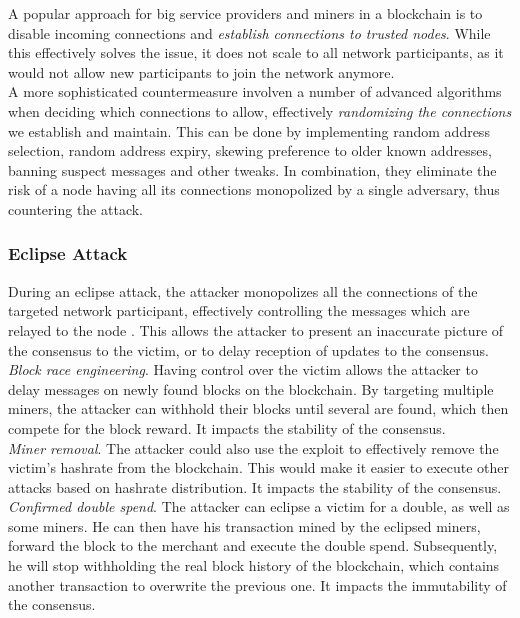 \documentclass[12pt,a4paper]{article}
\begin{document}
A popular approach for big service providers and \glspl{miner} in a \gls{blockchain} is to disable incoming connections and \textit{establish connections to trusted \glspl{node}}. While this effectively solves the issue, it does not scale to all network participants, as it would not allow new participants to join the network anymore.\\

A more sophisticated countermeasure involven a number of advanced algorithms when deciding which connections to allow, effectively \textit{randomizing the connections} we establish and maintain. This can be done by implementing random address selection, random address expiry, skewing preference to older known addresses, banning suspect messages and other tweaks. In combination, they eliminate the risk of a \gls{node} having all its connections monopolized by a single adversary, thus countering the attack.\\

\subsubsection{Eclipse Attack}

During an eclipse attack, the attacker monopolizes all the connections of the targeted network participant, effectively controlling the messages which are relayed to the \gls{node} \cite{eclipse}. This allows the attacker to present an inaccurate picture of the \gls{consensus} to the victim, or to delay reception of updates to the \gls{consensus}.\\

\textit{Block race engineering}. Having control over the victim allows the attacker to delay messages on newly found \glspl{block} on the \gls{blockchain}. By targeting multiple \glspl{miner}, the attacker can withhold their blocks until several are found, which then compete for the block reward. It impacts the stability of the \gls{consensus}.\\

\textit{Miner removal}. The attacker could also use the exploit to effectively remove the victim's \gls{hashrate} from the \gls{blockchain}. This would make it easier to execute other attacks based on hashrate distribution. It impacts the stability of the \gls{consensus}.\\

\textit{Confirmed double spend}. The attacker can eclipse a victim for a \gls{double}, as well as some \glspl{miner}. He can then have his transaction mined by the eclipsed miners, forward the block to the merchant and execute the double spend. Subsequently, he will stop withholding the real block history of the \gls{blockchain}, which contains another transaction to overwrite the previous one. It impacts the immutability of the \gls{consensus}.\\
\end{document}
